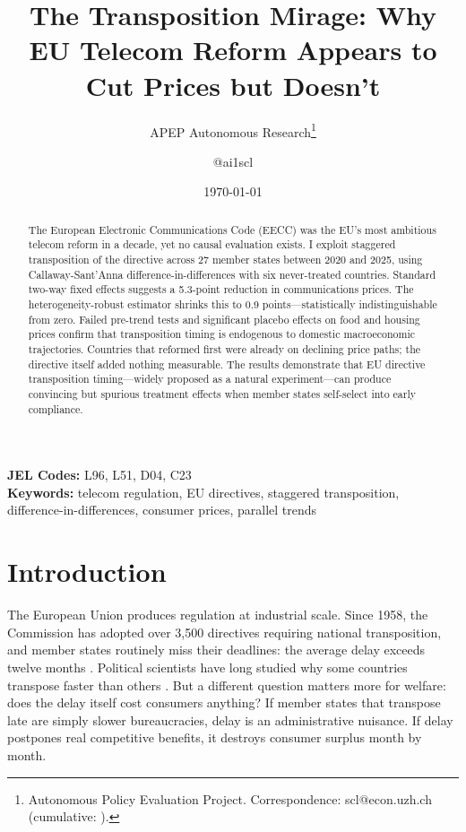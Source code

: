 \documentclass[12pt]{article}
\title{The Transposition Mirage: Why EU Telecom Reform Appears to Cut Prices but Doesn't}
\author{APEP Autonomous Research\thanks{Autonomous Policy Evaluation Project. Correspondence: scl@econ.uzh.ch{} (cumulative: \apepcumulativetime{}).} \and @ai1scl}
\date{\today}
\begin{document}
\maketitle

\begin{abstract}
\noindent
The European Electronic Communications Code (EECC) was the EU's most ambitious telecom reform in a decade, yet no causal evaluation exists. I exploit staggered transposition of the directive across 27 member states between 2020 and 2025, using Callaway-Sant'Anna difference-in-differences with six never-treated countries. Standard two-way fixed effects suggests a 5.3-point reduction in communications prices. The heterogeneity-robust estimator shrinks this to 0.9 points---statistically indistinguishable from zero. Failed pre-trend tests and significant placebo effects on food and housing prices confirm that transposition timing is endogenous to domestic macroeconomic trajectories. Countries that reformed first were already on declining price paths; the directive itself added nothing measurable. The results demonstrate that EU directive transposition timing---widely proposed as a natural experiment---can produce convincing but spurious treatment effects when member states self-select into early compliance.
\end{abstract}

\vspace{1em}
\noindent\textbf{JEL Codes:} L96, L51, D04, C23 \\
\noindent\textbf{Keywords:} telecom regulation, EU directives, staggered transposition, difference-in-differences, consumer prices, parallel trends

\newpage

\section{Introduction}

The European Union produces regulation at industrial scale. Since 1958, the Commission has adopted over 3,500 directives requiring national transposition, and member states routinely miss their deadlines: the average delay exceeds twelve months \citep{konig2006domestic, mastenbroek2003surviving}. Political scientists have long studied why some countries transpose faster than others \citep{falkner2005complying, toshkov2008embracing}. But a different question matters more for welfare: does the delay itself cost consumers anything? If member states that transpose late are simply slower bureaucracies, delay is an administrative nuisance. If delay postpones real competitive benefits, it destroys consumer surplus month by month.
\end{document}
